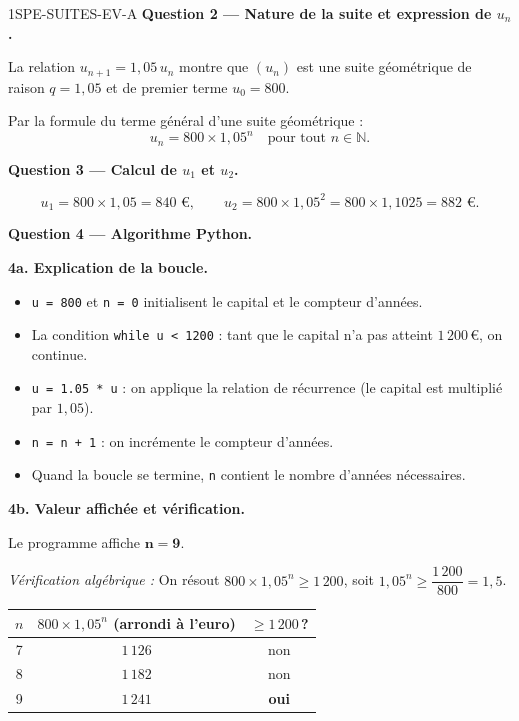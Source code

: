 \begin{corrige}{1SPE-SUITES-EV-A}
\medskip
\textbf{Question 2 — Nature de la suite et expression de $u_n$.}


La relation $u_{n+1} = 1{,}05\,u_n$ montre que $(u_n)$ est une suite géométrique de raison $q = 1{,}05$ et de premier terme $u_0 = 800$.

Par la formule du terme général d'une suite géométrique :
\[
  \boxed{u_n = 800 \times 1{,}05^n} \quad \text{pour tout } n \in \mathbb{N}.
\]

\medskip
\textbf{Question 3 — Calcul de $u_1$ et $u_2$.}

\[
  u_1 = 800 \times 1{,}05 = 840 \text{ €}, \qquad
  u_2 = 800 \times 1{,}05^2 = 800 \times 1{,}1025 = 882 \text{ €}.
\]

\medskip
\textbf{Question 4 — Algorithme Python.}

\textbf{4a. Explication de la boucle.}


\begin{itemize}
  \item \texttt{u = 800} et \texttt{n = 0} initialisent le capital et le compteur d'années.
  \item La condition \texttt{while u < 1200} : tant que le capital n'a pas atteint $1\,200$\,€, on continue.
  \item \texttt{u = 1.05 * u} : on applique la relation de récurrence (le capital est multiplié par $1{,}05$).
  \item \texttt{n = n + 1} : on incrémente le compteur d'années.
  \item Quand la boucle se termine, \texttt{n} contient le nombre d'années nécessaires.
\end{itemize}

\textbf{4b. Valeur affichée et vérification.}


Le programme affiche $\mathbf{n = 9}$.

\textit{Vérification algébrique :} On résout $800 \times 1{,}05^n \geq 1\,200$, soit $1{,}05^n \geq \dfrac{1\,200}{800} = 1{,}5$.

\begin{center}
\begin{tabular}{c|c|c}
$n$ & $800 \times 1{,}05^n$ (arrondi à l'euro) & $\geq 1\,200$\,? \\
\hline
7 & $1\,126$ & non \\
8 & $1\,182$ & non \\
9 & $1\,241$ & \textbf{oui} \\
\end{tabular}
\end{center}


\end{corrige}
